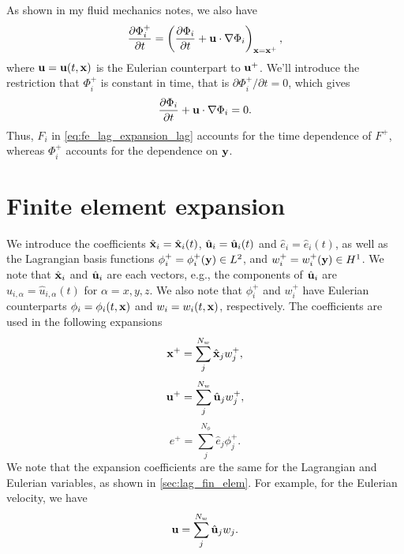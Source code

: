 \documentclass[11pt]{article}
\begin{document}
As shown in my fluid mechanics notes, we also have
\begin{equation}
    \label{eq:lag_fe_deriv_correspondence}
    \frac{\partial \Phi_i^+}{\partial t} = \left ( \frac{\partial \Phi_i}{\partial t} + \mathbf{u} \cdot \nabla \Phi_i \right )_{\mathbf{x} = \mathbf{x}^+},
\end{equation}
where $\mathbf{u} = \mathbf{u}(t,\mathbf{x})$ is the Eulerian counterpart to $\mathbf{u}^+$. We'll introduce the restriction that $\Phi_i^+$ is constant in time, that is $\partial \Phi_i^+/\partial t = 0$, which gives
\begin{equation}
    \frac{\partial \Phi_i}{\partial t} + \mathbf{u} \cdot \nabla \Phi_i = 0.
\end{equation}
Thus, $F_i$ in \cref{eq:fe_lag_expansion_lag} accounts for the time dependence of $F^+$, whereas $\Phi_i^+$ accounts for the dependence on $\mathbf{y}$.

\section{Finite element expansion}
We introduce the coefficients $\hat{\mathbf{x}}_i = \hat{\mathbf{x}}_i(t)$, $\hat{\mathbf{u}}_i = \hat{\mathbf{u}}_i(t)$ and $\hat{e}_i = \hat{e}_i(t)$, as well as the Lagrangian basis functions $\phi^+_i = \phi^+_i(\mathbf{y}) \in L^2$, and $w^+_i = w^+_i(\mathbf{y}) \in H^1$. We note that $\hat{\mathbf{x}}_i$ and $\hat{\mathbf{u}}_i$ are each vectors, e.g., the components of $\hat{\mathbf{u}}_i$ are $\hat{u}_{i,\alpha} = \hat{u}_{i,\alpha}(t)$ for $\alpha = x,y,z$. We also note that $\phi^+_i$ and $w^+_i$ have Eulerian counterparts $\phi_i = \phi_i(t,\mathbf{x})$ and $w_i = w_i(t,\mathbf{x})$, respectively. The coefficients are used in the following expansions
\begin{equation}
    \label{eq:fe_exp_x}
    \mathbf{x}^+ = \sum_j^{N_w} \hat{\mathbf{x}}_j w^+_j,
\end{equation}
\begin{equation}
    \label{eq:fe_exp_u}
    \mathbf{u}^+ = \sum_j^{N_w} \hat{\mathbf{u}}_j w^+_j,
\end{equation}
\begin{equation}
    \label{eq:fe_exp_e}
    e^+ = \sum_j^{N_\phi} \hat{e}_j \phi^+_j.
\end{equation}
We note that the expansion coefficients are the same for the Lagrangian and Eulerian variables, as shown in \cref{sec:lag_fin_elem}. For example, for the Eulerian velocity, we have
\begin{equation}
    \mathbf{u} = \sum_j^{N_w} \hat{\mathbf{u}}_j w_j.
\end{equation}
\end{document}
